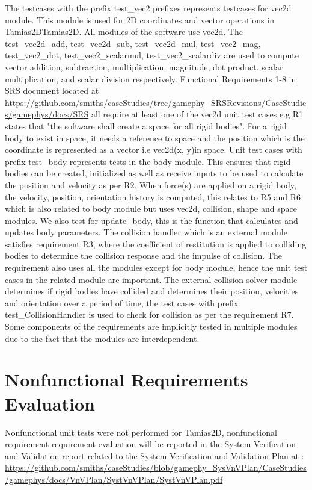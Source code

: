 \documentclass[12pt, titlepage]{article}
\newcommand{\progname}{Tamias2D}
\begin{document}
The testcases with the prefix test\_vec2 prefixes represents testcases for vec2d module. This module is used for 2D coordinates and vector operations in \progname{Tamias2D}. All modules of the software use vec2d. The test\_vec2d\_add, test\_vec2d\_sub, test\_vec2d\_mul, test\_vec2\_mag, test\_vec2\_dot, test\_vec2\_scalarmul, test\_vec2\_scalardiv are used to compute vector addition, subtraction, multiplication, magnitude, dot product, scalar multiplication, and scalar division respectively. Functional Requirements 1-8 in SRS document located at \url{https://github.com/smiths/caseStudies/tree/gamephy_SRSRevisions/CaseStudies/gamephys/docs/SRS} all require at least one of the vec2d unit test cases e.g R1 states that "the software shall create a space for all rigid bodies". For a rigid body to exist in space, it needs a reference to space and the position which is the coordinate is represented as a vector i.e vec2d(x, y)in space.
Unit test cases with prefix test\_body represents tests in the body module. This ensures that rigid bodies can be created, initialized as well as receive inputs to be used to calculate the position and velocity as per R2. When force(s) are applied on a rigid body, the velocity, position, orientation history is computed, this relates to R5 and R6 which is also related to body module but uses vec2d, collision, shape and space modules. We also test for update\_body, this is the function that calculates and updates body parameters. The collision handler which is an external module satisfies requirement R3, where the coefficient of restitution is applied to colliding bodies to determine the collision response and the impulse of collision. The requirement also uses all the modules except for body module, hence the unit test cases in the related module are important. The external collision solver module determines if rigid bodies have collided and determines their position, velocities and orientation over a period of time, the test cases with prefix test\_CollisionHandler is used to check for collision as per the requirement R7. Some components of the requirements are implicitly tested in multiple modules due to the fact that the modules are interdependent. 

\section{Nonfunctional Requirements Evaluation}
Nonfunctional unit tests were not performed for \progname, nonfunctional requirement requirement evaluation will be reported in the System Verification and Validation report related to the System Verification and Validation Plan at : \url{https://github.com/smiths/caseStudies/blob/gamephy_SysVnVPlan/CaseStudies/gamephys/docs/VnVPlan/SystVnVPlan/SystVnVPlan.pdf}
	
\end{document}
